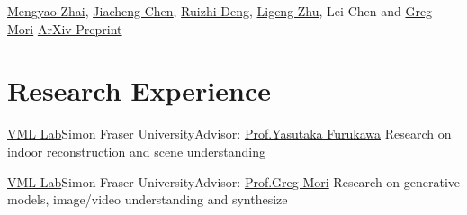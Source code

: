 \documentclass[12pt,a4paper,sans]{moderncv}   %
\begin{document}


{}
{\newline \href{https://mzhai.weebly.com/}{Mengyao Zhai}, \underline{\href{http://jcchen.me/}{Jiacheng Chen}}, \href{http://www.sfu.ca/~ruizhid/}{Ruizhi Deng}, \href{https://lzhu.me/}{Ligeng Zhu}, Lei Chen and \href{http://www.cs.sfu.ca/~mori/}{Greg Mori}}
{\newline \href{}{ArXiv Preprint}}
{}




\section{Research Experience}

{\newline \href{http://vml.cs.sfu.ca/}{VML Lab}}{Simon Fraser University}{Advisor: \href{http://www.cs.sfu.ca/~furukawa/}{Prof.Yasutaka Furukawa}}
{Research on indoor reconstruction and scene understanding}


{\newline \href{http://vml.cs.sfu.ca/}{VML Lab}}{Simon Fraser University}{Advisor: \href{http://www.cs.sfu.ca/~mori/}{Prof.Greg Mori}}
{Research on generative models, image/video understanding and synthesize%
}
\end{document}
